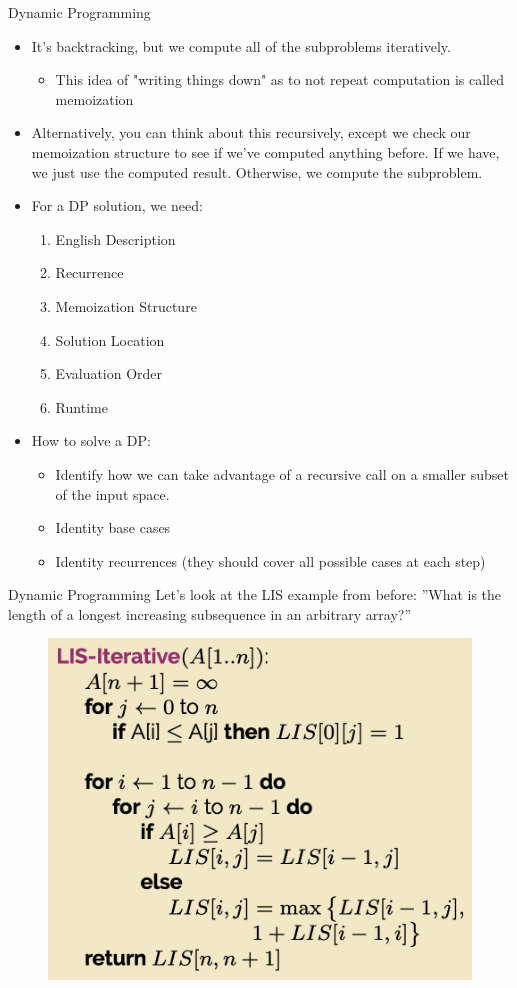 \documentclass{beamer}
\begin{document}
\begin{frame}[t]{Dynamic Programming}
  \begin{itemize}
      \item It's backtracking, but we compute all of the subproblems iteratively.
      \begin{itemize}
          \item This idea of "writing things down" as to not repeat computation is called \alert{memoization} 
      \end{itemize}   
      \pause
      \item Alternatively, you can think about this recursively, except we check our memoization structure to see if we've computed anything before. If we have, we just use the computed result. Otherwise, we compute the subproblem.
      \pause
      \item For a DP solution, we need:
      \begin{enumerate}
            \item English Description
            \item Recurrence
            \item Memoization Structure
            \item Solution Location
            \item Evaluation Order
            \item Runtime
      \end{enumerate}
      \pause
      \item \alert{How to solve a DP:}
      \begin{itemize}
          \item Identify how we can take advantage of a recursive call on a smaller subset of the input space.
          \item Identity base cases
          \item Identity recurrences (they should cover all possible cases at each step)
      \end{itemize}
  \end{itemize}
\end{frame}

\begin{frame}[t]{Dynamic Programming}
  Let's look at the LIS example from before:
  ''What is the length of a longest increasing subsequence in an arbitrary array?''
  \pause
  \begin{figure}
      \centering
      \includegraphics[width=0.5\linewidth]{dp.png}
  \end{figure}
\end{frame}
\end{document}
